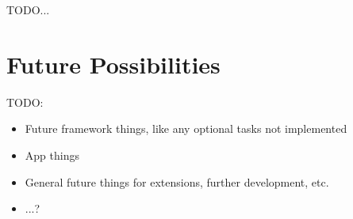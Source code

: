 TODO...

\section{Future Possibilities}

TODO:

\begin{itemize}
\item Future framework things, like any optional tasks not implemented
\item App things
\item General future things for extensions, further development, etc.
\item ...?
\end{itemize}
